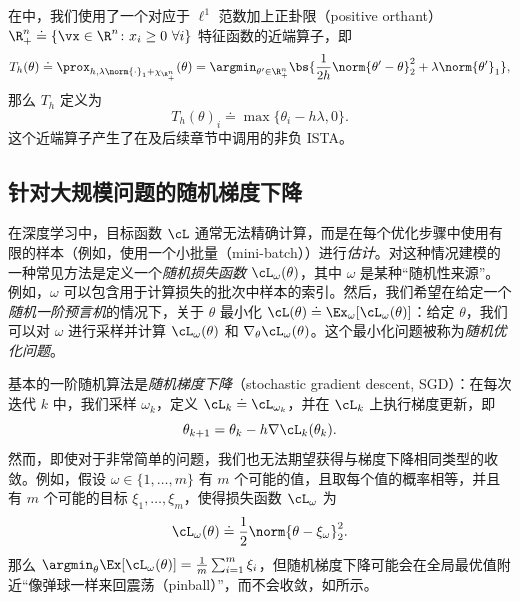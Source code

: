 \documentclass[../../book-main_zh.tex]{subfiles}
\begin{document}
\begin{example}\label{example:prox-of-nonnegative-l1}
    在中，我们使用了一个对应于 \(\ell^{1}\) 范数加上正卦限（positive orthant）\(\R_{+}^{n} \doteq \{\vx \in
    \R^{n} \colon x_{i} \geq 0\ \forall i\}\) 特征函数的近端算子，即
    \begin{equation}
        T_{h}(\theta) \doteq \prox_{h, \lambda\norm{\cdot}_{1} +
        \chi_{\R_{+}^{n}}}(\theta) = \argmin_{\theta^{\prime} \in
        \R_{+}^{n}}\bs{\frac{1}{2h}\norm{\theta^{\prime} -
        \theta}_{2}^{2} + \lambda\norm{\theta^{\prime}}_{1}},
    \end{equation}
    那么 \(T_{h}\) 定义为
    \begin{equation}
        T_{h}(\theta)_{i} \doteq \max\{\theta_{i} - h\lambda, 0\}.
    \end{equation}
    这个近端算子产生了在及后续章节中调用的非负 ISTA。
\end{example}

\subsection{针对大规模问题的随机梯度下降}

在深度学习中，目标函数 \(\cL\) 通常无法精确计算，而是在每个优化步骤中使用有限的样本（例如，使用一个小批量（mini-batch））进行\textit{估计}。对这种情况建模的一种常见方法是定义一个\textit{随机损失函数} \(\cL_{\omega}(\theta)\)，其中 \(\omega\) 是某种“随机性来源”。例如，\(\omega\) 可以包含用于计算损失的批次中样本的索引。然后，我们希望在给定一个\textit{随机一阶预言机}的情况下，关于 \(\theta\) 最小化 \(\cL(\theta) \doteq
\Ex_{\omega}[\cL_{\omega}(\theta)]\)：给定 \(\theta\)，我们可以对 \(\omega\) 进行采样并计算 \(\cL_{\omega}(\theta)\) 和 \(\nabla_{\theta}\cL_{\omega}(\theta)\)。这个最小化问题被称为\textit{随机优化问题}。

基本的一阶随机算法是\textit{随机梯度下降}（stochastic gradient descent, SGD）：在每次迭代 \(k\) 中，我们采样 \(\omega_{k}\)，定义 \(\cL_{k} \doteq \cL_{\omega_{k}}\)，并在 \(\cL_{k}\) 上执行梯度更新，即
\begin{equation}
    \theta_{k + 1} = \theta_{k} - h\nabla \cL_{k}(\theta_{k}).
\end{equation}
然而，即使对于非常简单的问题，我们也无法期望获得与梯度下降相同类型的收敛。例如，假设 \(\omega \in \{1, \dots, m\}\) 有 \(m\) 个可能的值，且取每个值的概率相等，并且有 \(m\) 个可能的目标 \(\xi_{1}, \dots, \xi_{m}\)，使得损失函数 \(\cL_{\omega}\) 为
\begin{equation}
    \cL_{\omega}(\theta) \doteq \frac{1}{2}\norm{\theta - \xi_{\omega}}_{2}^{2}.
\end{equation}
那么 \(\argmin_{\theta}\Ex[\cL_{\omega}(\theta)] = \frac{1}{m}\sum_{i
= 1}^{m}\xi_{i}\)，但随机梯度下降可能会在全局最优值附近“像弹球一样来回震荡（pinball）”，而不会收敛，如所示。
\end{document}
